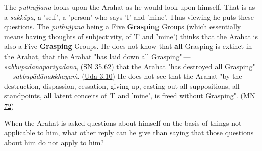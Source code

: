 The \emph{puthujjana} looks upon the Arahat as he would look upon himself. That is as a \emph{sakkāya}, a 'self', a 'person' who says 'I' and 'mine'. Thus viewing he puts these questions. The \emph{puthujjana} being a Five \textbf{Grasping} Groups (which essentially means having thoughts of subjectivity, of 'I' and 'mine') thinks that the Arahat is also a Five \textbf{Grasping} Groups. He does not know that \textbf{all} Grasping is extinct in the Arahat, that the Arahat "has laid down all Grasping" --- \emph{sabbupādānapariyādāna}, (\href{https://suttacentral.net/sn35.62/en/bodhi}{SN 35.62}) that the Arahat "has destroyed all Grasping" --- \emph{sabbupādānakkhayaṁ}. (\href{https://suttacentral.net/ud3.10/en/anandajoti}{Uda 3.10}) He does not see that the Arahat "by the destruction, dispassion, cessation, giving up, casting out all suppositions, all standpoints, all latent conceits of 'I' and 'mine', is freed without Grasping". (\href{https://suttacentral.net/mn72/en/thanissaro}{MN 72})

When the Arahat is asked questions about himself on the basis of things not applicable to him, what other reply can he give than saying that those questions about him do not apply to him?

